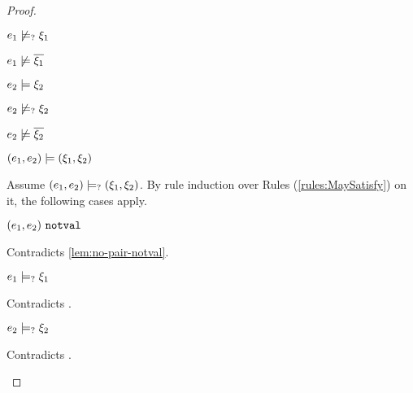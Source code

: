 \begin{proof}
\begin{byCases}
\begin{byCases}
\begin{byCases}
\begin{pfsteps*}
            \item $e_1 \not\models_{?} \xi_1$  
            \item $e_1 \not\models \overline{\xi_1}$  
            \item $e_2 \models \xi_2$  
            \item $e_2 \not\models_{?} \xi_2$  
            \item $e_2 \not\models \overline{\xi_2}$  
            \item $(e_1 , e_2) \models (\xi_1 , \xi_2)$ 
            \end{pfsteps*}
            Assume $(e_1 , e_2) \models_{?} (\xi_1 , \xi_2)$. By rule induction over Rules (\ref{rules:MaySatisfy}) on it, the following cases apply.
            \begin{byCases}
            \item[\text{(\ref{rule:CMSNotVal})}]
                \begin{pfsteps*}
                \item $(e_1 , e_2) ~\mathtt{notval}$ 
                \end{pfsteps*}
                Contradicts \autoref{lem:no-pair-notval}.
            \item[\text{(\ref{rule:CMSPair1})}]
                \begin{pfsteps*}
                \item $e_1 \models_{?} \xi_1$ 
                \end{pfsteps*}
                Contradicts .
            \item[\text{(\ref{rule:CMSPair2})}]
                \begin{pfsteps*}
                \item $e_2 \models_{?} \xi_2$ 
                \end{pfsteps*}
                Contradicts .
            \item[\text{(\ref{rule:CMSPair3})}]
                \begin{pfsteps*}

\end{pfsteps*}
\end{byCases}
\end{byCases}
\end{byCases}
\end{byCases}
\end{proof}
